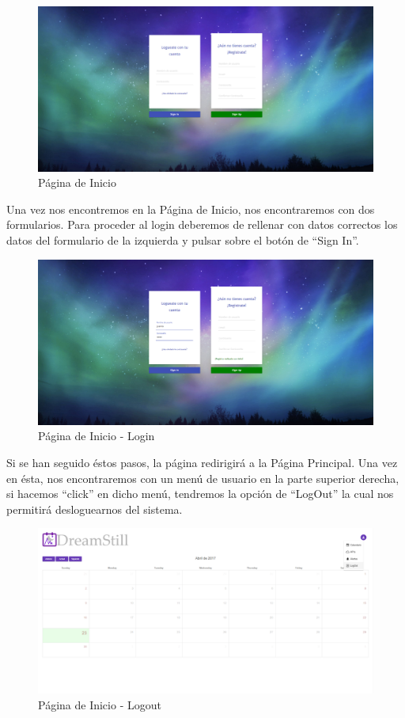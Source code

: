 \documentclass[11pt,openany]{book}
\begin{document}
\begin{figure}[H]
\centering
\includegraphics[totalheight=6cm]{manualUsuario/paginaInicio.png}
\caption{Página de Inicio}
\end{figure}

Una vez nos encontremos en la Página de Inicio, nos encontraremos con dos formularios. Para proceder al login deberemos de rellenar con datos correctos los datos del formulario de la izquierda y pulsar sobre el botón de ``Sign In''.

\begin{figure}[H]
\centering
\includegraphics[totalheight=6cm]{manualUsuario/login.png}
\caption{Página de Inicio - Login}
\end{figure}

Si se han seguido éstos pasos, la página redirigirá a la Página Principal. Una vez en ésta, nos encontraremos con un menú de usuario en la parte superior derecha, si hacemos ``click'' en dicho menú, tendremos la opción de ``LogOut'' la cual nos permitirá desloguearnos del sistema.

\begin{figure}[H]
\centering
\includegraphics[totalheight=6cm]{manualUsuario/logout.png}
\caption{Página de Inicio - Logout}
\end{figure}
\end{document}

